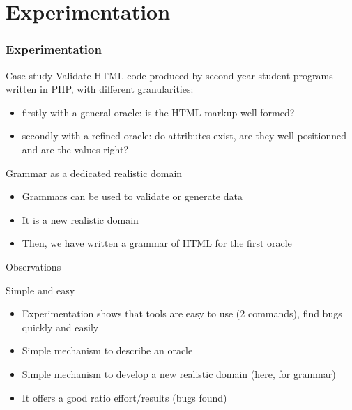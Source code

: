 \documentclass[10pt]{beamer}
\newcommand{\outlinereminder}[0]{
  \frame{\frametitle{Outline}
  \tableofcontents[currentsection,subsectionstyle=show/show/hide]}
}
\begin{document}
\section{Experimentation}

\outlinereminder

\begin{frame}
\frametitle{Experimentation}

\begin{block}{Case study}
Validate HTML code produced by second year student programs written in PHP, with
different granularities:
\begin{itemize}
\item firstly with a general oracle: is the HTML markup well-formed?
\item secondly with a refined oracle: do attributes exist, are they
well-positionned and are the values right?
\end{itemize}
\end{block}

\begin{block}{Grammar as a dedicated realistic domain}
\begin{itemize}
\item Grammars can be used to validate or generate data
\item It is a new realistic domain
\item Then, we have written a grammar of HTML for the first oracle
\end{itemize}
\end{block}

\end{frame}

\begin{frame}{Observations}

\begin{block}{Simple and easy}
\begin{itemize}
\item Experimentation shows that tools are easy to use (2 commands), find bugs
quickly and easily
\item Simple mechanism to describe an oracle
\item Simple mechanism to develop a new realistic domain (here, for grammar)
\item It offers a good ratio effort/results (bugs found)
\end{itemize}
\end{block}

\end{frame}
\end{document}
